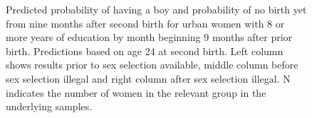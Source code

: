 \documentclass[12pt,letterpaper]{article}
\begin{document}
\begin{figure}[htpb]
\setcounter{subfigure}{3}
\caption{Predicted probability of having a boy and probability of
no birth yet from nine months after second birth for urban 
women with 8 or more years of education by month beginning 9 months after prior birth. 
Predictions based on age 24 at second birth.
Left column shows results prior to sex selection available, middle column before
sex selection illegal and right column after sex selection illegal.
N indicates the number of women in the relevant group in the underlying samples.
}
\label{fig:results_spell3_high_urban}
\end{figure}
\end{document}
